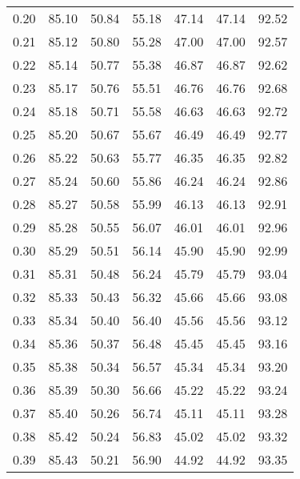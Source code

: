 \begin{tabular}{|c|c|c|c|c|c|c|}
      0.20 &     85.10 &     50.84 &      55.18 &   47.14 &      47.14 &         92.52 \\
      0.21 &     85.12 &     50.80 &      55.28 &   47.00 &      47.00 &         92.57 \\
      0.22 &     85.14 &     50.77 &      55.38 &   46.87 &      46.87 &         92.62 \\
      0.23 &     85.17 &     50.76 &      55.51 &   46.76 &      46.76 &         92.68 \\
      0.24 &     85.18 &     50.71 &      55.58 &   46.63 &      46.63 &         92.72 \\
      0.25 &     85.20 &     50.67 &      55.67 &   46.49 &      46.49 &         92.77 \\
      0.26 &     85.22 &     50.63 &      55.77 &   46.35 &      46.35 &         92.82 \\
      0.27 &     85.24 &     50.60 &      55.86 &   46.24 &      46.24 &         92.86 \\
      0.28 &     85.27 &     50.58 &      55.99 &   46.13 &      46.13 &         92.91 \\
      0.29 &     85.28 &     50.55 &      56.07 &   46.01 &      46.01 &         92.96 \\
      0.30 &     85.29 &     50.51 &      56.14 &   45.90 &      45.90 &         92.99 \\
      0.31 &     85.31 &     50.48 &      56.24 &   45.79 &      45.79 &         93.04 \\
      0.32 &     85.33 &     50.43 &      56.32 &   45.66 &      45.66 &         93.08 \\
      0.33 &     85.34 &     50.40 &      56.40 &   45.56 &      45.56 &         93.12 \\
      0.34 &     85.36 &     50.37 &      56.48 &   45.45 &      45.45 &         93.16 \\
      0.35 &     85.38 &     50.34 &      56.57 &   45.34 &      45.34 &         93.20 \\
      0.36 &     85.39 &     50.30 &      56.66 &   45.22 &      45.22 &         93.24 \\
      0.37 &     85.40 &     50.26 &      56.74 &   45.11 &      45.11 &         93.28 \\
      0.38 &     85.42 &     50.24 &      56.83 &   45.02 &      45.02 &         93.32 \\
      0.39 &     85.43 &     50.21 &      56.90 &   44.92 &      44.92 &         93.35 \\

\end{tabular}
